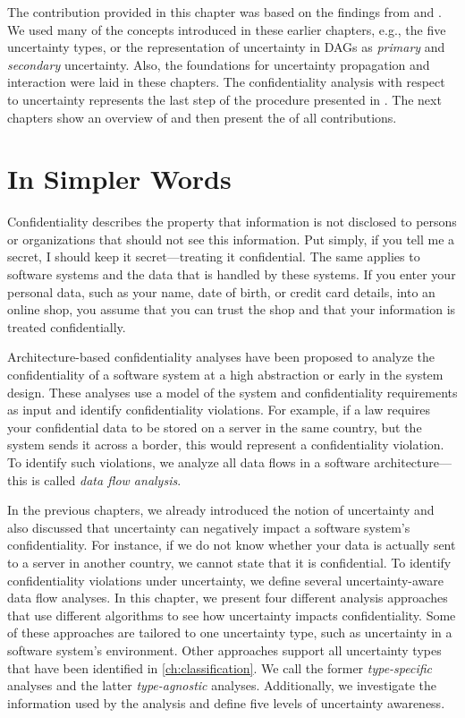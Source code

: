 The contribution provided in this chapter was based on the findings from  and .
We used many of the concepts introduced in these earlier chapters, e.g., the five uncertainty types, or the representation of uncertainty in \acp{DAG} as \emph{primary} and \emph{secondary} uncertainty.
Also, the foundations for uncertainty propagation and interaction were laid in these chapters.
The confidentiality analysis with respect to uncertainty represents the last step of the procedure presented in .
The next chapters show an overview of  and then present the  of all contributions.





\section{In Simpler Words}%
\label{sec:confidentialityanalysis:simple}

Confidentiality describes the property that information is not disclosed to persons or organizations that should not see this information.
Put simply, if you tell me a secret, I should keep it secret---treating it confidential.
The same applies to software systems and the data that is handled by these systems.
If you enter your personal data, such as your name, date of birth, or credit card details, into an online shop, you assume that you can trust the shop and that your information is treated confidentially.

Architecture-based confidentiality analyses have been proposed to analyze the confidentiality of a software system at a high abstraction or early in the system design.
These analyses use a model of the system and confidentiality requirements as input and identify confidentiality violations.
For example, if a law requires your confidential data to be stored on a server in the same country, but the system sends it across a border, this would represent a confidentiality violation.
To identify such violations, we analyze all data flows in a software architecture---this is called \emph{data flow analysis}.

In the previous chapters, we already introduced the notion of uncertainty and also discussed that uncertainty can negatively impact a software system's confidentiality.
For instance, if we do not know whether your data is actually sent to a server in another country, we cannot state that it is confidential.
To identify confidentiality violations under uncertainty, we define several uncertainty-aware data flow analyses.
In this chapter, we present four different analysis approaches that use different algorithms to see how uncertainty impacts confidentiality.
Some of these approaches are tailored to one uncertainty type, such as uncertainty in a software system's environment.
Other approaches support all uncertainty types that have been identified in \autoref{ch:classification}.
We call the former \emph{type-specific} analyses and the latter \emph{type-agnostic} analyses.
Additionally, we investigate the information used by the analysis and define five levels of uncertainty awareness.

